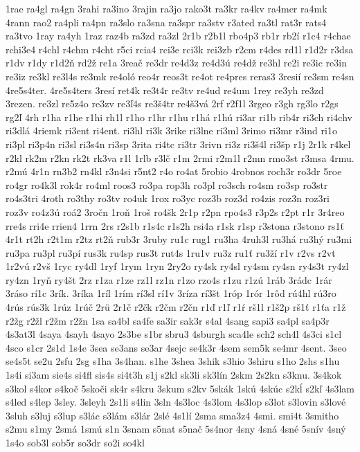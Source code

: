 {1rae
ra4gl
ra4gn
3rahi
ra3ino
3rajin
ra3jo
rako3t
ra3kr
ra4kv
ra4mer
ra4mk
4rann
rao2
ra4pli
ra4pn
ra3slo
ra3sna
ra3spr
ra3stv
r3ated
ra3tl
rat3r
rats4
ra3tvo
1ray
ra4yh
1raz
raz4b
ra3zd
ra3zl
2r1b
r2b1l
rbo4p3
rb1r
rb2í
r1c4
r4chae
rchi3e4
r4chl
r4chm
r4cht
r5ci
rcia4
rci3e
rci3k
rci3zb
r2cm
r4des
rd1l
r1d2r
r3dsa
r1dv
r1dy
r1d2ň
rd2ž
re1a
3reač
re3dr
re4d3z
re4d3ú
re4dž
re3hl
re2i
re3ic
re3in
re3iz
re3kl
re3l4s
re3mk
re4oló
reo4r
reos3t
re4ot
re4pres
reras3
3resií
re3sm
re4sn
4re5s4ter.
4re5s4ters
3resí
ret4k
re3t4r
re3tv
re4ud
re4um
1rey
re3yh
re3zd
3rezen.
re3zl
re5z4o
re3zv
re3ľ4s
re3š4tr
re4š3vá
2rf
r2f1l
3rgeo
r3gh
rg3lo
r2gs
rg2ľ
4rh
r1ha
r1he
r1hi
rh1l
r1ho
r1hr
r1hu
r1há
r1hú
ri3ar
ri1b
rib4r
ri3ch
ri4chv
ri3dlá
4riemk
ri3ent
ri4ent.
ri3hl
ri3k
3rike
ri3lne
ri3ml
3rimo
ri3mr
r3ind
ri1o
ri3pl
ri3p4n
ri3sl
ri3s4n
ri3sp
3rita
ri4tc
ri3tr
3rivn
ri3z
ri3š4l
ri3šp
r1j
2r1k
r4kel
r2kl
rk2m
r2kn
rk2t
rk3va
r1l
1rlb
r3lč
r1m
2rmi
r2m1l
r2mn
rmo3st
r3msa
4rmu.
r2mú
4r1n
rn3b2
rn4kl
r3n4si
r5nt2
r4o
ro4at
5robio
4robnos
roch3r
ro3dr
5roe
ro4gr
ro4k3l
rok4r
ro4ml
roos3
ro3pa
rop3h
ro3pl
ro3sch
ro4sm
ro3sp
ro3str
ro4s3tri
4roth
ro3thy
ro3tv
ro4uk
1rox
ro3yc
roz3b
roz3d
ro4zis
roz3n
roz3ri
roz3v
ro4z3ú
roá2
3ročn
1roň
1roš
ro4šk
2r1p
r2pn
rpo4s3
r3p2s
r2pt
r1r
3r4reo
rre4s
rri4e
rrien4
1rrn
2rs
r2s1b
r1s4c
r1s2h
rsi4a
r1sk
r1sp
r3stona
r3stono
rs1ť
4r1t
rt2h
r2t1m
r2tz
rt2ň
rub3r
3ruby
ru1c
rug1
ru3ha
4ruh3l
ru3há
ru3hý
ru3mi
ru3pa
ru3pl
ru3pí
rus3k
ru4sp
rus3t
rut4s
1ru1v
ru3z
ru1ť
ru3ží
r1v
r2vs
r2vt
1r2vú
r2vš
1ryc
ry4dl
1ryf
1rym
1ryn
2ry2o
ry4sk
ry4sl
ry4sm
ry4sn
ry4s3t
ry4zl
ry4zn
1ryň
ry4št
2rz
r1za
r1ze
rz1l
rz1n
r1zo
rzo4s
r1zu
r1zú
1ráb
3rádc
1rár
3ráso
rí1c
3rík.
3ríka
1ríl
1rím
rí3sl
rí1v
3ríza
rí3št
1róp
1rór
1rôd
rú4hl
rú3ro
4rús
rús3k
1rúz
1rúč
2rü
2r1č
r2čk
r2čm
r2čn
r1ď
r1ľ
r1ŕ
rš1l
r1š2p
rš1ť
r1ťa
r1ž
r2žg
r2žl
r2žm
r2žn
1sa
sa4bl
sa4fe
sa3ir
sak3r
s4al
4sang
sapi3
sa4pl
sa4p3r
4s3at3l
4saya
4sayh
4sayo
2s3be
s1br
sbru3
4sburgh
sca4le
sch2
sch4l
4s3ci
s1cl
4sco
s1cr
2s1d
1s4e
3sea
se3ans
se3ar
4sejc
se4k3r
4sem
sem5k
se4mr
4sent.
3seo
se4s5t
se2u
2sfu
2sg
s1ha
3s4han.
s1he
3shea
3shik
s3hio
3shiru
s1ho
2shs
s1hu
1s4i
si3am
sie4s
si4fl
sis4s
si4t3h
s1j
s2kl
sk3li
sk3lín
2skm
2s2kn
s3knu.
3s4kok
s3kol
s4kor
s4koč
5skoči
sk4r
s4kru
3skum
s2kv
5skák
1skú
4skúc
s2kĺ
s2kľ
4s3lam
s4led
s4lep
3sley.
3sleyh
2s1li
s4lin
3sln
4s3loc
4s3lom
4s3lop
s3lot
s3lovin
s3lové
3sluh
s3luj
s3lup
s3lác
s3lám
s3lár
2slé
4s1lí
2sma
sma3z4
4smi.
smi4t
3smitho
s2mu
s1my
2smá
1smú
s1n
3snam
s5nat
s5nač
5s4nor
4sny
4sná
4sné
5snív
4sný
1s4o
sob3l
sob5r
so3dr
so2i
so4kl
}
